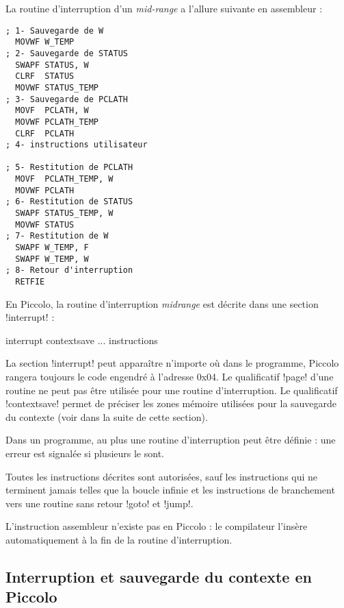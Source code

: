La routine d'interruption d'un \emph{mid-range} a l'allure suivante en assembleur :

\begin{lstlisting}[language=assembleur]
; 1- Sauvegarde de W
  MOVWF W_TEMP 
; 2- Sauvegarde de STATUS
  SWAPF STATUS, W
  CLRF  STATUS
  MOVWF STATUS_TEMP 
; 3- Sauvegarde de PCLATH
  MOVF  PCLATH, W
  MOVWF PCLATH_TEMP 
  CLRF  PCLATH
; 4- instructions utilisateur

; 5- Restitution de PCLATH
  MOVF  PCLATH_TEMP, W
  MOVWF PCLATH 
; 6- Restitution de STATUS
  SWAPF STATUS_TEMP, W
  MOVWF STATUS
; 7- Restitution de W
  SWAPF W_TEMP, F
  SWAPF W_TEMP, W
; 8- Retour d'interruption
  RETFIE
\end{lstlisting}








En Piccolo, la routine d’interruption \emph{midrange} est décrite dans une section \pic!interrupt! :

\begin{piccolo}
interrupt contextsave ... {
 instructions
}
\end{piccolo}

La section \pic!interrupt! peut apparaître n’importe où dans le programme, Piccolo rangera toujours le code engendré à l’adresse 0x04. Le qualificatif \pic!page! d’une routine ne peut pas être utilisée pour une routine d’interruption. Le qualificatif \pic!contextsave! permet de préciser les zones mémoire utilisées pour la sauvegarde du contexte (voir dans la suite de cette section).

Dans un programme, au plus une routine d’interruption peut être définie : une erreur est signalée si plusieurs le sont.

Toutes les instructions décrites sont autorisées, sauf les instructions qui ne terminent jamais telles que la boucle infinie et les instructions de branchement vers une routine sans retour \pic!goto! et \pic!jump!.

L’instruction assembleur  n’existe pas en Piccolo : le compilateur l’insère automatiquement à la fin de la routine d’interruption.

\subsection{Interruption et sauvegarde du contexte en Piccolo}

